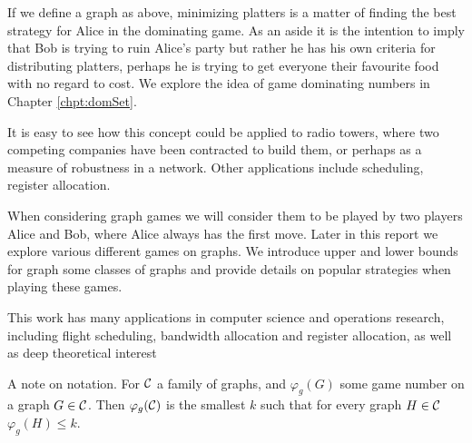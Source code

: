 If we define a graph as above, minimizing platters is a matter of finding the best strategy for Alice in the dominating game. 
As an aside it is the intention to imply that Bob is trying to ruin Alice's party but rather he has his own criteria for distributing platters, perhaps he is trying to get everyone their favourite food with no regard to cost. We explore the idea of game dominating numbers in Chapter \ref{chpt:domSet}.

It is easy to see how this concept could be applied to radio towers, where two competing companies have been contracted to build them, or perhaps as a measure of robustness in a network. Other applications include scheduling, register allocation.  

When considering graph games we will consider them to be played by two players Alice and Bob, where Alice always has the first move. Later in this report we explore various different games on graphs. We introduce upper and lower bounds for graph some classes of graphs and provide details on popular strategies when playing these games.   




  
This work has many applications in computer science and operations research, including flight scheduling, bandwidth allocation and register allocation, as well as deep theoretical interest%
    
A note on notation. For $\mathcal{C}$ a family of graphs, and $\varphi_g(G)$ some game number on a graph $G \in \mathcal{C}$. Then $\varphi_g(\mathcal{C})$ is the smallest $k$ such that for every graph $H\in\mathcal{C}$ $\varphi_g(H)\leq k$.   

    
    
    
    
    
    
    
    
    
    
    
    
    
    
    
    
    
    
    
    
    